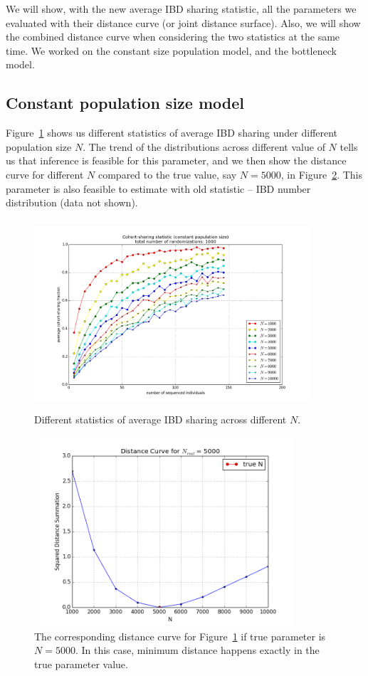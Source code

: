 \documentclass{bioinfo}
\begin{document}
We will show, with the new average IBD sharing statistic, all the parameters we evaluated with their distance curve (or joint distance surface). Also, we will show the combined distance curve when considering the two statistics at the same time. We worked on the constant size population model, and the bottleneck model.

\subsection{Constant population size model}

Figure~\ref{fig:dis_N} shows us different statistics of average IBD sharing under different population size $N$. The trend of the distributions across different value of $N$ tells us that inference is feasible for this parameter, and we then show the distance curve for different $N$ compared to the true value, say $N = 5000$, in Figure~\ref{fig:like_N}. This parameter is also feasible to estimate with old statistic -- IBD number distribution (data not shown).

\begin{figure}[h]
\centerline{\includegraphics[width=290pt, height=200pt]{dis_N.png}}
\caption{Different statistics of average IBD sharing across different $N$.}\label{fig:dis_N}
\end{figure}

\begin{figure}[h]
\centerline{\includegraphics[width=280pt, height=200pt]{like_N.png}}
\caption{The corresponding distance curve for Figure~\ref{fig:dis_N} if true parameter is $N=5000$. In this case, minimum distance happens exactly in the true parameter value.}\label{fig:like_N}
\end{figure}
\end{document}
